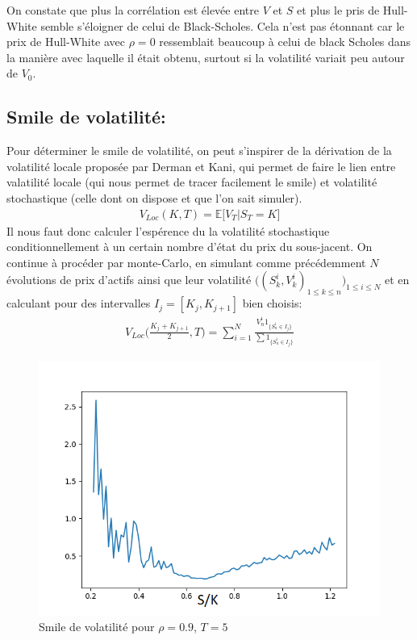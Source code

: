 \documentclass{report}
\begin{document}
On constate que plus la corrélation est élevée entre $V$ et $S$ et plus le pris de Hull-White semble s'éloigner de celui de Black-Scholes. Cela n'est pas étonnant car le prix de Hull-White avec $\rho = 0$ ressemblait beaucoup à celui de black Scholes dans la manière avec laquelle il était obtenu, surtout si la volatilité variait peu autour de $V_0$.

\subsection*{Smile de volatilité:}
Pour déterminer le smile de volatilité, on peut s'inspirer de la dérivation de la volatilité locale proposée par Derman et Kani, qui permet de faire le lien entre valatilité locale (qui nous permet de tracer facilement le smile) et volatilité stochastique (celle dont on dispose et que l'on sait simuler).
\begin{eqnarray*}
V_{Loc}(K, T) = \mathbb{E}\big[V_T | S_T = K]
\end{eqnarray*}
Il nous faut donc calculer l'espérence du la volatilité stochastique conditionnellement à un certain nombre d'état du prix du sous-jacent. On continue à procéder par monte-Carlo, en simulant comme précédemment $N$ évolutions de prix d'actifs ainsi que leur volatilité $\big((S^i_k, V^i_k)_{1\leq k\leq n}\big)_{1\leq i\leq N}$ et en calculant pour des intervalles $I_j = [K_j, K_{j+1}]$ bien choisis:
\begin{eqnarray*}
V_{Loc}\Big(\frac{K_j + K_{j+1}}{2}, T\Big) = \sum\limits_{i=1}^N\frac{V^i_n 1_{\{S^i_n \in I_j\}}}{\sum{1_{\{S^i_n \in I_j\}}}}
\end{eqnarray*}

\begin{figure}[H]
\begin{center}
\includegraphics[scale=0.7]{smile01.png}
\end{center}
\caption{Smile de volatilité pour $\rho = 0.9$, $T = 5$}
\end{figure} 
\end{document}
